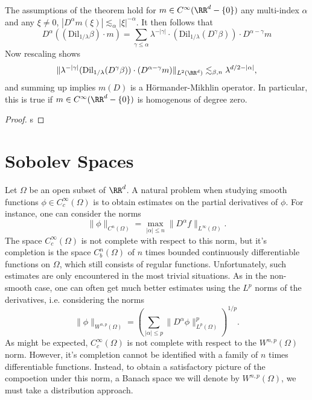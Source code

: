 \begin{remark}
  The assumptions of the theorem hold for $m \in C^\infty(\RR^d - \{ 0 \})$ any multi-index $\alpha$ and any $\xi \neq 0$, $|D^\alpha m(\xi)| \lesssim_\alpha |\xi|^{-\alpha}$. It then follows that
  \[ D^\alpha((\text{Dil}_{1/\lambda} \beta) \cdot m) = \sum_{\gamma \leq \alpha} \lambda^{-|\gamma|} \cdot (\text{Dil}_{1/\lambda} (D^\gamma \beta)) \cdot D^{\alpha - \gamma} m \]
  Now rescaling shows
  \begin{align*}
    \| \lambda^{-|\gamma|} (\text{Dil}_{1/\lambda} (D^\gamma \beta)) \cdot (D^{\alpha - \gamma} m) \|_{L^2(\RR^d)} \lesssim_{\beta,n} \lambda^{d/2-|\alpha|},
  \end{align*}
  and summing up implies $m(D)$ is a H\"{o}rmander-Mikhlin operator. In particular, this is true if $m \in C^\infty(\RR^d - \{ 0 \})$ is homogenous of degree zero.
\end{remark}

\begin{proof}
  s
\end{proof}











\chapter{Sobolev Spaces}

Let $\Omega$ be an open subset of $\RR^d$. A natural problem when studying smooth functions $\phi \in C_c^\infty(\Omega)$ is to obtain estimates on the partial derivatives of $\phi$. For instance, one can consider the norms
%
\[ \| \phi \|_{C^n(\Omega)} = \max_{|\alpha| \leq n} \| D^\alpha f \|_{L^\infty(\Omega)}. \]
%
The space $C_c^\infty(\Omega)$ is not complete with respect to this norm, but it's completion is the space $C^n_b(\Omega)$ of $n$ times bounded continuously differentiable functions on $\Omega$, which still consists of regular functions. Unfortunately, such estimates are only encountered in the most trivial situations. As in the non-smooth case, one can often get much better estimates using the $L^p$ norms of the derivatives, i.e. considering the norms
%
\[ \| \phi \|_{W^{n,p}(\Omega)} = \left( \sum_{|\alpha| \leq p} \| D^\alpha \phi \|_{L^p(\Omega)}^p \right)^{1/p}. \]
%
As might be expected, $C_c^\infty(\Omega)$ is not complete with respect to the $W^{n,p}(\Omega)$ norm. However, it's completion cannot be identified with a family of $n$ times differentiable functions. Instead, to obtain a satisfactory picture of the compoetion under this norm, a Banach space we will denote by $W^{n,p}(\Omega)$, we must take a distribution approach.

